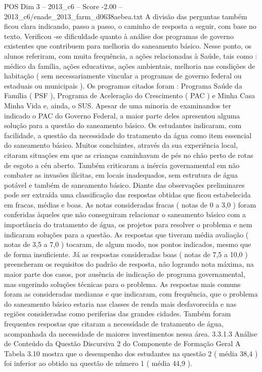 \begin{textsample}{POS Dim 3 – 2013\_c6 – Score -2.00 – 2013\_c6/enade\_2013\_farm\_d0638aebea.txt}
A divisão das perguntas também ficou clara indicando, passo a passo, o caminho de resposta a seguir, com base no texto.
Verificou -se dificuldade quanto à análise dos programas de governo existentes que contribuem para melhoria do saneamento básico.
Nesse ponto, os alunos referiram, com muita frequência, a ações relacionadas à Saúde, tais como : médico da família, ações educativas, ações ambientais, melhoria nas condições de habitação ( sem necessariamente vincular a programas de governo federal ou estaduais ou municipais ).
Os programas citados foram : Programa Saúde da Família ( PSF ), Programa de Aceleração do Crescimento ( PAC ) e Minha Casa Minha Vida e, ainda, o SUS.
Apesar de uma minoria de examinandos ter indicado o PAC do Governo Federal, a maior parte deles apresentou alguma solução para a questão do saneamento básico.
Os estudantes indicaram, com facilidade, a questão da necessidade do tratamento da água como item essencial do saneamento básico.
Muitos concluintes, através da sua experiência local, citaram situações em que as crianças caminhavam de pés no chão perto de rotas de esgoto a céu aberto.
Também criticaram a inércia governamental em não combater as invasões ilícitas, em locais inadequados, sem estrutura de água potável e também de saneamento básico.
Diante das observações preliminares pode ser extraída uma classificação das respostas obtidas que ficou estabelecida em fracas, médias e boas.
As notas consideradas fracas ( notas de 0 a 3,0 ) foram conferidas àqueles que não conseguiram relacionar o saneamento básico com a importância do tratamento de água, os projetos para resolver o problema e nem indicaram soluções para a questão.
As respostas que tiveram média avaliação ( notas de 3,5 a 7,0 ) tocaram, de algum modo, nos pontos indicados, mesmo que de forma insuficiente.
Já as respostas consideradas boas ( notas de 7,5 a 10,0 ) preencheram os requisitos do padrão de resposta, não logrando nota máxima, na maior parte dos casos, por ausência de indicação de programa governamental, mas sugerindo soluções técnicas para o problema.
As respostas mais comuns foram as consideradas medianas e que indicaram, com frequência, que o problema do saneamento básico estaria nas classes de renda mais desfavorecida e nas regiões consideradas como periferias das grandes cidades.
Também foram frequentes respostas que citaram a necessidade de tratamento de água, acompanhada da necessidade de maiores investimentos nessa área. 3.3.1.3 Análise de Conteúdo da Questão Discursiva 2 do Componente de Formação Geral A Tabela 3.10 mostra que o desempenho dos estudantes na questão 2 ( média 38,4 ) foi inferior ao obtido na questão de número 1 ( média 44,9 ).

\end{textsample}
